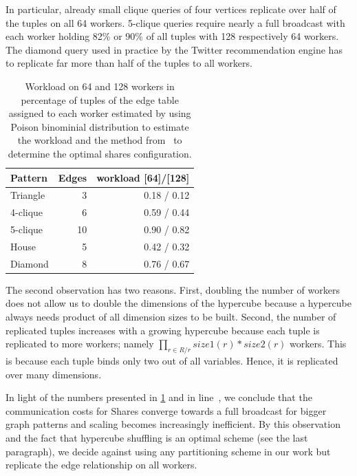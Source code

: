 In particular, already small clique queries of four vertices replicate over half of the tuples on all 64 workers.
5-clique queries require nearly a full broadcast with each worker holding 82\% or 90\% of all tuples with 128 respectively 64 workers.
The diamond query used in practice by the Twitter recommendation engine has to replicate far more than half of the tuples to all workers.

\begin{table}[t]
    \centering
    \begin{tabular}{lrr}
        \toprule
        Pattern  & Edges  & workload [64]/[128] \\ \midrule
        Triangle & 3                 & 0.18 / 0.12    \\
        4-clique & 6                 & 0.59 / 0.44    \\
        5-clique & 10                & 0.90 / 0.82    \\
        House    & 5                 & 0.42 / 0.32    \\
        Diamond  & 8                 & 0.76 / 0.67    \\
        \bottomrule
    \end{tabular}
    \caption{Workload on 64 and 128 workers in percentage of tuples of the edge table assigned to each worker estimated by using
    Poison binominial distribution to estimate the workload and the method from~\cite{myria-detailed}
    to determine the optimal shares configuration.
    }
    \label{table:shares-workload-estimate}
\end{table}

The second observation has two reasons.
First, doubling the number of workers does not allow us to double the dimensions of the hypercube because a hypercube always needs
product of all dimension sizes to be built.
Second, the number of replicated tuples increases with a growing hypercube because each tuple is replicated to more workers;
namely $\prod_{r \in R / r} size1(r) * size2(r)$ workers.
This is because each tuple binds only two out of all variables.
Hence, it is replicated over many dimensions.

In light of the numbers presented in \cref{table:shares-workload-estimate} and in line~\cite{ammar2018distributed},
we conclude that the communication costs for Shares converge towards a full broadcast for bigger graph patterns and
scaling becomes increasingly inefficient.
By this observation and the fact that hypercube shuffling is an optimal scheme (see the last paragraph),
we decide against using any partitioning scheme in our work but replicate the edge relationship on all
workers.

